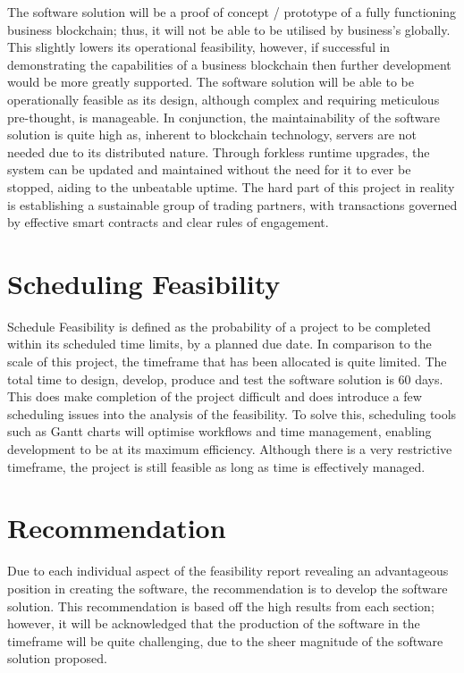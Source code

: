 The software solution will be a proof of concept / prototype of a fully functioning business blockchain; thus, it will not be able to be utilised by business's globally. This slightly lowers its operational feasibility, however, if successful in demonstrating the capabilities of a business blockchain then further development would be more greatly supported. The software solution will be able to be operationally feasible as its design, although complex and requiring meticulous pre-thought, is manageable. In conjunction, the maintainability of the software solution is quite high as, inherent to blockchain technology, servers are not needed due to its distributed nature. Through forkless runtime upgrades, the system can be updated and maintained without the need for it to ever be stopped, aiding to the unbeatable uptime. The hard part of this project in reality is establishing a sustainable group of trading partners, with transactions governed by effective smart contracts and clear rules of engagement. \\

\section{Scheduling Feasibility}

Schedule Feasibility is defined as the probability of a project to be completed within its scheduled time limits, by a planned due date. In comparison to the scale of this project, the timeframe that has been allocated is quite limited. The total time to design, develop, produce and test the software solution is 60 days. This does make completion of the project difficult and does introduce a few scheduling issues into the analysis of the feasibility. To solve this, scheduling tools such as Gantt charts will optimise workflows and time management, enabling development to be at its maximum efficiency. Although there is a very restrictive timeframe, the project is still feasible as long as time is effectively managed. \\

\section{Recommendation}

Due to each individual aspect of the feasibility report revealing an advantageous position in creating the software, the recommendation is to develop the software solution. This recommendation is based off the high results from each section; however, it will be acknowledged that the production of the software in the timeframe will be quite challenging, due to the sheer magnitude of the software solution proposed. \\



